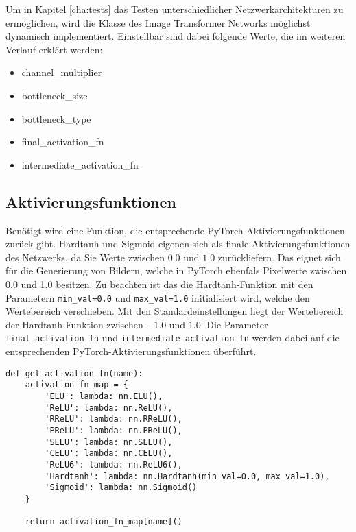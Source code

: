 \pagebreak

Um in Kapitel \ref{cha:tests} das Testen unterschiedlicher Netzwerkarchitekturen zu ermöglichen, wird die Klasse des Image Transformer Networks möglichst dynamisch implementiert. Einstellbar sind dabei folgende Werte, die im weiteren Verlauf erklärt werden:

\begin{itemize}
    \item channel\_multiplier
    \item bottleneck\_size
    \item bottleneck\_type
    \item final\_activation\_fn
    \item intermediate\_activation\_fn
\end{itemize}

\subsection{Aktivierungsfunktionen}

Benötigt wird eine Funktion, die entsprechende PyTorch-Aktivierungsfunktionen zurück gibt. Hardtanh und Sigmoid eigenen sich als finale Aktivierungsfunktionen des Netzwerks, da Sie Werte zwischen $ 0.0 $ und $ 1.0 $ zurückliefern. Das eignet sich für die Generierung von Bildern, welche in PyTorch ebenfals Pixelwerte zwischen $ 0.0 $ und 1.0 besitzen. Zu beachten ist das die Hardtanh-Funktion mit den Parametern \texttt{min_val=0.0} und \texttt{max_val=1.0} initialisiert wird, welche den Wertebereich verschieben. Mit den Standardeinstellungen liegt der Wertebereich der Hardtanh-Funktion zwischen $ -1.0 $ und $ 1.0 $. Die Parameter \texttt{final_activation_fn} und \texttt{intermediate_activation_fn} werden dabei auf die entsprechenden PyTorch-Aktivierungsfunktionen überführt.

\begin{listing}[H]
\begin{verbatim}
def get_activation_fn(name):
    activation_fn_map = {
        'ELU': lambda: nn.ELU(),
        'ReLU': lambda: nn.ReLU(),
        'RReLU': lambda: nn.RReLU(),
        'PReLU': lambda: nn.PReLU(),
        'SELU': lambda: nn.SELU(),
        'CELU': lambda: nn.CELU(),
        'ReLU6': lambda: nn.ReLU6(),
        'Hardtanh': lambda: nn.Hardtanh(min_val=0.0, max_val=1.0),
        'Sigmoid': lambda: nn.Sigmoid()
    }

    return activation_fn_map[name]()
\end{verbatim}
\end{listing}

